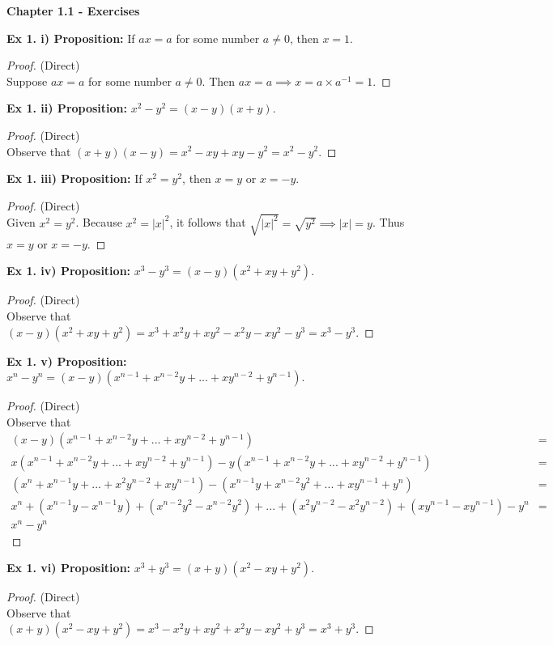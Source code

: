 \documentclass{article}
\date{}
\author{}
\begin{document}
	
	\centerline{\textbf{Chapter 1.1 - Exercises}}
	
	\textbf{Ex 1. i) Proposition:} If $ax=a$ for some number $a \not= 0$, then $x=1$.
	\begin{proof}
		(Direct)\\
		Suppose $ax=a$ for some number $a \not= 0$. Then $ax=a \implies x=a \times a^{-1} = 1$.
	\end{proof}
	
	\textbf{Ex 1. ii) Proposition:} $x^2-y^2=(x-y)(x+y)$.
	\begin{proof}
		(Direct)\\
		Observe that $(x+y)(x-y) = x^2-xy+xy-y^2=x^2-y^2$.
	\end{proof}
	
	\textbf{Ex 1. iii) Proposition:} If $x^2=y^2$, then $x=y$ or $x=-y$.
	\begin{proof}
		(Direct)\\
		Given $x^2=y^2$. Because $x^2=|x|^2$, it follows that $\sqrt{|x|^2}=\sqrt{y^2} \implies |x|=y$. Thus $x=y$ or $x=-y$.
	\end{proof}
	
	\textbf{Ex 1. iv) Proposition:} $x^3-y^3=(x-y)(x^2+xy+y^2)$.
	\begin{proof}
		(Direct)\\
		Observe that $(x-y)(x^2+xy+y^2)=x^3+x^2y+xy^2-x^2y-xy^2-y^3=x^3-y^3$.
	\end{proof}
	
	\textbf{Ex 1. v) Proposition:} $x^n-y^n=(x-y)(x^{n-1} + x^{n-2}y + ... + xy^{n-2} + y^{n-1})$.
	\begin{proof}
		(Direct)\\
		Observe that
		\begin{align*}
			(x-y)(x^{n-1} + x^{n-2}y + ... + xy^{n-2} + y^{n-1}) &=\\
			x(x^{n-1} + x^{n-2}y + ... + xy^{n-2} + y^{n-1})-y(x^{n-1} + x^{n-2}y + ... + xy^{n-2} + y^{n-1}) &=\\
			(x^{n} + x^{n-1}y + ... + x^2y^{n-2} + xy^{n-1})-
			(x^{n-1}y + x^{n-2}y^2 + ... + xy^{n-1} + y^{n}) &=\\
			x^{n} + (x^{n-1}y-x^{n-1}y) + (x^{n-2}y^2-x^{n-2}y^2) + ... + (x^{2}y^{n-2}-x^{2}y^{n-2}) + (xy^{n-1}-xy^{n-1}) - y^n &=\\
			x^n-y^n
		\end{align*}
	\end{proof}
	
	\textbf{Ex 1. vi) Proposition:} $x^3+y^3=(x+y)(x^2-xy+y^2)$.
	\begin{proof}
		(Direct)\\
		Observe that $(x+y)(x^2-xy+y^2)=x^3-x^2y+xy^2+x^2y-xy^2+y^3=x^3+y^3$.
	\end{proof}
	
\end{document}
